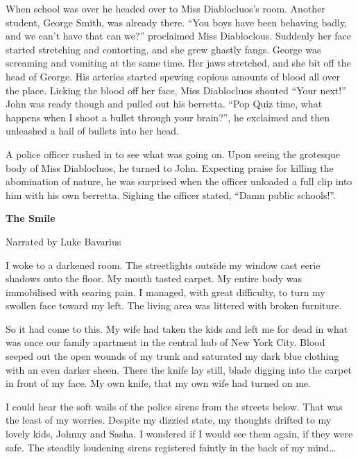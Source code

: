 When school was over he headed over to Miss Diablocluos's
room. Another student, George Smith, was already there. ``You
boys have been behaving badly, and we can't have that can
we?'' proclaimed Miss Diabloclous. Suddenly her face started
stretching and contorting, and she grew ghastly fangs. George was
screaming and vomiting at the same time. Her jaws stretched, and
she bit off the head of George. His arteries started spewing
copious amounts of blood all over the place. Licking the blood off
her face, Miss Diablocluos shouted ``Your next!'' John
was ready though and pulled out his berretta. ``Pop Quiz time,
what happens when I shoot a bullet through your brain?'', he
exclaimed and then unleashed a hail of bullets into her head.



A police officer rushed in to see what was going on. Upon seeing
the grotesque body of Miss Diablocluos, he turned to John.
Expecting praise for killing the abomination of nature, he was
surprised when the officer unloaded a full clip into him with his
own berretta. Sighing the officer stated, ``Damn public
schools!''. 
 





{\bf The Smile}

Narrated by Luke Bavarius



I woke to a darkened room. The streetlights outside my window cast
eerie shadows onto the floor. My mouth tasted carpet. My entire
body was immobilised with searing pain. I managed, with great
difficulty, to turn my swollen face toward my left. The living area
was littered with broken furniture.



So it had come to this. My wife had taken the kids and left me for
dead in what was once our family apartment in the central hub of
New York City. Blood seeped out the open wounds of my trunk and
saturated my dark blue clothing with an even darker sheen. There
the knife lay still, blade digging into the carpet in front of my
face. My own knife, that my own wife had turned on me.



I could hear the soft wails of the police sirens from the streets
below. That was the least of my worries. Despite my dizzied state,
my thoughts drifted to my lovely kids, Johnny and Sasha. I wondered
if I would see them again, if they were safe. The steadily
loudening sirens registered faintly in the back of my mind{\ldots}



